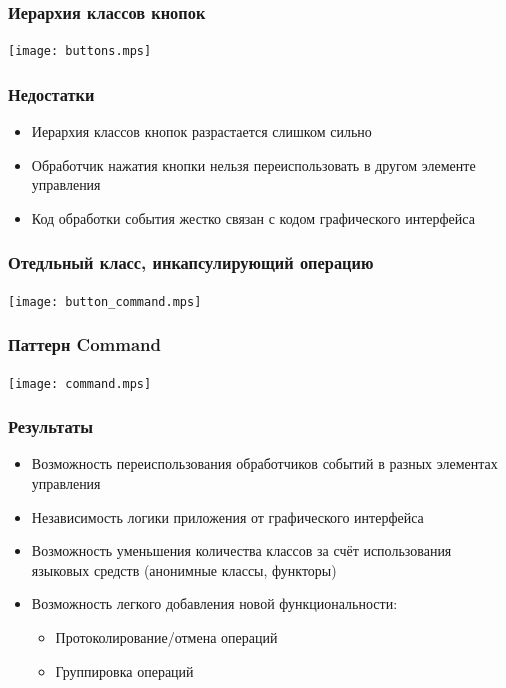 \documentclass[handout]{beamer}
\begin{document}
\begin{frame}[fragile]
\frametitle{Иерархия классов кнопок}
\begin{center}
\texttt{[image: buttons.mps]}
\end{center}
\end{frame}


\begin{frame}[fragile]
\frametitle{Недостатки}
\begin{itemize}
\item Иерархия классов кнопок разрастается слишком сильно
\item Обработчик нажатия кнопки нельзя переиспользовать в другом элементе управления
\item Код обработки события жестко связан с кодом графического интерфейса
\end{itemize}
\end{frame}


\begin{frame}[fragile]
\frametitle{Отедльный класс, инкапсулирующий операцию}
\begin{center}
\texttt{[image: button\_command.mps]}
\end{center}
\end{frame}


\begin{frame}[fragile]
\frametitle{Паттерн Command}
\begin{center}
\texttt{[image: command.mps]}
\end{center}
\end{frame}


\begin{frame}[fragile]
\frametitle{Результаты}
\begin{itemize}
\item Возможность переиспользования обработчиков событий в разных элементах управления
\item Независимость логики приложения от графического интерфейса
\item Возможность уменьшения количества классов за счёт использования языковых средств (анонимные классы, функторы)
\item Возможность легкого добавления новой функциональности:
    \begin{itemize}
    \item Протоколирование/отмена операций
    \item Группировка операций
    \end{itemize}
\end{itemize}
\end{frame}
\end{document}
